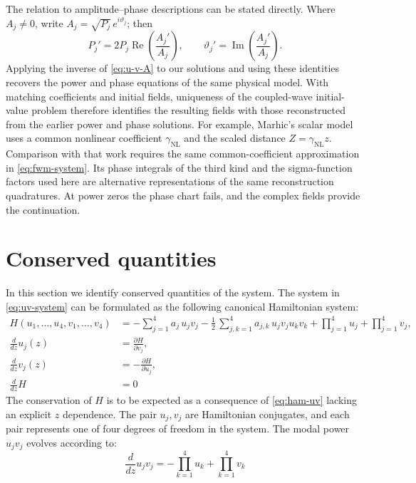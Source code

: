 \documentclass[11pt,a4paper]{article}
\numberwithin{equation}{section}
\begin{document}
The relation to amplitude--phase descriptions can be stated directly.
Where $A_j\ne0$, write $A_j=\sqrt{P_j}\,e^{i\vartheta_j}$; then
\begin{equation}
P_j'=2P_j\operatorname{Re}\!\left(\frac{A_j'}{A_j}\right),\qquad
\vartheta_j'=\operatorname{Im}\!\left(\frac{A_j'}{A_j}\right).
\label{eq:amplitude-phase-correspondence}
\end{equation}
Applying the inverse of \eqref{eq:u-v-A} to our solutions and using these identities recovers the power and phase equations of the same physical model.
With matching coefficients and initial fields, uniqueness of the coupled-wave initial-value problem therefore identifies the resulting fields with those reconstructed from the earlier power and phase solutions.
For example, Marhic's scalar model \cite[Eq.~(1)]{marhicAnalyticSolutionsPhases2013} uses a common nonlinear coefficient $\gamma_{\mathrm{NL}}$ and the scaled distance $Z=\gamma_{\mathrm{NL}}z$.
Comparison with that work requires the same common-coefficient approximation in \eqref{eq:fwm-system}.
Its phase integrals of the third kind and the sigma-function factors used here are alternative representations of the same reconstruction quadratures.
At power zeros the phase chart fails, and the complex fields provide the continuation.



\section{Conserved quantities}

In this section we identify conserved quantities of the system.
The system in \eqref{eq:uv-system} can be formulated as the following canonical Hamiltonian system:
\begin{align}
\label{eq:ham-uv}
H(u_1,\dots, u_4, v_1, \dots, v_4) &= -\sum_{j=1}^{4} a_{j}\, u_j v_j - \frac{1}{2}\,\sum_{j,k=1}^{4} a_{j,k}\, u_j v_j u_k v_k + \prod\limits_{j=1}^{4} u_j + \prod\limits_{j=1}^{4} v_j, \\
\frac{d}{d z} u_j{\left(z \right)} &= \frac{\partial H}{\partial v_j}, \\
\frac{d}{d z} v_j{\left(z \right)} &= -\frac{\partial H}{\partial u_j}, \\
\frac{d}{d z} H &= 0
\end{align}
The conservation of $H$ is to be expected as a consequence of \eqref{eq:ham-uv} lacking an explicit $z$ dependence. The pair $u_j, v_j$ are Hamiltonian conjugates, and each pair represents one of four degrees of freedom in the system.
The modal power $u_j v_j$ evolves according to:
\begin{equation}
\label{eq:duv_j}
\frac{d}{d z} u_j v_j = - \prod\limits_{k=1}^{4} u_k + \prod\limits_{k=1}^{4} v_k
\end{equation}
\end{document}
